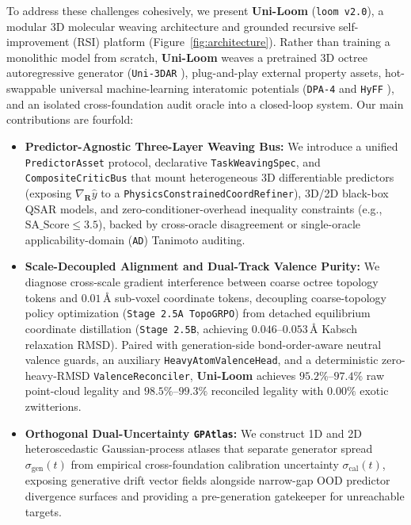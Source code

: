 \documentclass[11pt,a4paper]{article}
\begin{document}
To address these challenges cohesively, we present \textbf{Uni-Loom} (\texttt{loom v2.0}), a modular 3D molecular weaving architecture and grounded recursive self-improvement (RSI) platform (Figure~\ref{fig:architecture}). Rather than training a monolithic model from scratch, \textbf{Uni-Loom} weaves a pretrained 3D octree autoregressive generator (\texttt{Uni-3DAR} \citep{lu2025uni3dar}), plug-and-play external property assets, hot-swappable universal machine-learning interatomic potentials (\texttt{DPA-4} \citep{deepmodeling2026dpa4} and \texttt{HyFF} \citep{hyra2026hyff}), and an isolated cross-foundation audit oracle into a closed-loop system. Our main contributions are fourfold:

\begin{itemize}[leftmargin=1.5em,itemsep=2pt,topsep=3pt]
    \item \textbf{Predictor-Agnostic Three-Layer Weaving Bus:} We introduce a unified \texttt{PredictorAsset} protocol, declarative \texttt{TaskWeavingSpec}, and \texttt{CompositeCriticBus} that mount heterogeneous 3D differentiable predictors (exposing $\nabla_{\mathbf{R}}\hat{y}$ to a \texttt{PhysicsConstrainedCoordRefiner}), 3D/2D black-box QSAR models, and zero-conditioner-overhead inequality constraints (e.g., $\text{SA\_Score} \le 3.5$), backed by cross-oracle disagreement or single-oracle applicability-domain (\texttt{AD}) Tanimoto auditing.
    \item \textbf{Scale-Decoupled Alignment and Dual-Track Valence Purity:} We diagnose cross-scale gradient interference between coarse octree topology tokens and $0.01\,\text{\AA}$ sub-voxel coordinate tokens, decoupling coarse-topology policy optimization (\texttt{Stage 2.5A TopoGRPO}) from detached equilibrium coordinate distillation (\texttt{Stage 2.5B}, achieving $0.046\text{--}0.053\,\text{\AA}$ Kabsch relaxation RMSD). Paired with generation-side bond-order-aware neutral valence guards, an auxiliary \texttt{HeavyAtomValenceHead}, and a deterministic zero-heavy-RMSD \texttt{ValenceReconciler}, \textbf{Uni-Loom} achieves $95.2\%\text{--}97.4\%$ raw point-cloud legality and $98.5\%\text{--}99.3\%$ reconciled legality with $0.00\%$ exotic zwitterions.
    \item \textbf{Orthogonal Dual-Uncertainty \texttt{GPAtlas}:} We construct 1D and 2D heteroscedastic Gaussian-process atlases \citep{rasmussen2006gp} that separate generator spread $\sigma_{\text{gen}}(t)$ from empirical cross-foundation calibration uncertainty $\sigma_{\text{cal}}(t)$, exposing generative drift vector fields alongside narrow-gap OOD predictor divergence surfaces and providing a pre-generation gatekeeper for unreachable targets.

\end{itemize}
\end{document}
